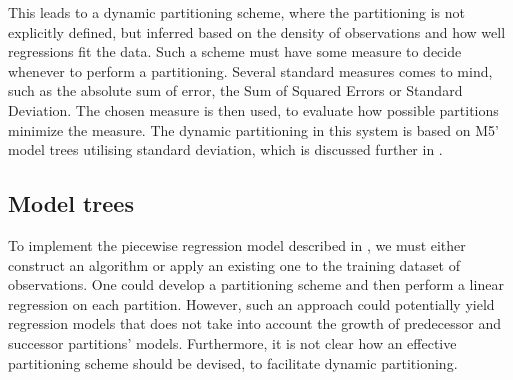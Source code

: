 This leads to a dynamic partitioning scheme, where the partitioning is not explicitly defined, but inferred based on the density of observations and how well regressions fit the data. Such a scheme must have some measure to decide whenever to perform a partitioning. Several standard measures comes to mind, such as the absolute sum of error, the Sum of Squared Errors or Standard Deviation. The chosen measure is then used, to evaluate how possible partitions minimize the measure.
The dynamic partitioning in this system is based on M5' model trees utilising standard deviation, which is discussed further in .



\subsection{Model trees}\label{patterns:weka}
To implement the piecewise regression model described in , we must either construct an algorithm or apply an existing one to the training dataset of observations. One could develop a partitioning scheme and then perform a linear regression on each partition. However, such an approach could potentially yield regression models that does not take into account the growth of predecessor and successor partitions' models. Furthermore, it is not clear how an effective partitioning scheme should be devised, to facilitate dynamic partitioning.

